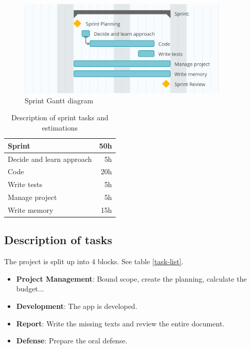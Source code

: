 \begin{figure}[h!]
\begin{center}
\includegraphics[width=10cm]{media/diagrams/gantt-sprint.png}
\end{center}
\caption[Sprint Gantt diagram]{Sprint Gantt diagram}
\label{fig:sprint_gantt}
\end{figure}

\begin{table}[]
    \centering
    \begin{singlespace}
    
    \begin{tabular}{lr} 
    \toprule
    \textbf{Sprint} & \textbf{50h} \\
    \midrule
    \hspace{3mm}Decide and learn approach & 5h \\
    \hspace{3mm}Code & 20h \\
    \hspace{3mm}Write tests & 5h \\
    \hspace{3mm}Manage project & 5h \\
    \hspace{3mm}Write memory & 15h \\
    \bottomrule
    \end{tabular}
    \end{singlespace}
    
    \caption{Description of sprint tasks and estimations}
    \label{sprint-task-list}
\end{table}

\subsection{Description of tasks}
\label{sec:schedule-blocks}

The project is split up into 4 blocks. See table \ref{task-list}.

\begin{itemize}
    \item \textbf{Project Management}: Bound scope, create the planning, calculate the budget...
    \item \textbf{Development}: The app is developed.
    \item \textbf{Report}: Write the missing texts and review the entire document.
    \item \textbf{Defense}: Prepare the oral defense.
\end{itemize}

